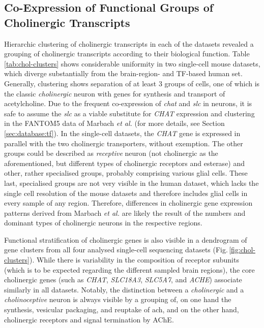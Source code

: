 \subsection{Co-Expression of Functional Groups of Cholinergic Transcripts}
Hierarchic clustering of cholinergic transcripts in each of the datasets revealed a grouping of cholinergic transcripts according to their biological function. Table \ref{tab:chol-clusters} shows considerable uniformity in two single-cell mouse datasets, which diverge substantially from the brain-region- and TF-based human set. Generally, clustering shows separation of at least 3 groups of cells, one of which is the classic \emph{cholinergic} neuron with genes for synthesis and transport of acetylcholine. Due to the frequent co-expression of \emph{\ac{chat}} and \emph{\ac{slc}} in neurons, it is safe to assume the \emph{\ac{slc}} as a viable substitute for \emph{CHAT} expression and clustering in the FANTOM5 data of Marbach \emph{et al.}\cite{Marbach2016} (for more details, see Section \ref{sec:database:tf}). In the single-cell datasets, the \emph{CHAT} gene is expressed in parallel with the two cholinergic transporters, without exemption. The other groups could be described as \emph{receptive} neuron (not cholinergic as the aforementioned, but different types of cholinergic receptors and esterase) and other, rather specialised groups, probably comprising various glial cells. These last, specialised groups are not very visible in the human dataset, which lacks the single cell resolution of the mouse datasets and therefore includes glial cells in every sample of any region. Therefore, differences in cholinergic gene expression patterns derived from Marbach \emph{et al.} are likely the result of the numbers and dominant types of cholinergic neurons in the respective regions.

Functional stratification of cholinergic genes is also visible in a dendrogram of gene clusters from all four analysed single-cell sequencing datasets (Fig.\,\ref{fig:chol-clusters}). While there is variability in the composition of receptor subunits (which is to be expected regarding the different sampled brain regions), the core cholinergic genes (such as \emph{CHAT}, \emph{SLC18A3}, \emph{SLC5A7}, and \emph{ACHE}) associate similarly in all datasets. Notably, the distinction between a \emph{cholinergic} and a \emph{cholinoceptive} neuron is always visible by a grouping of, on one hand the synthesis, vesicular packaging, and reuptake of \ac{ach}, and on the other hand, cholinergic receptors and signal termination by AChE.

